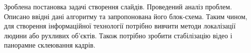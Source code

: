 \chapterConclusion

Зроблена постановка задачі створення слайдів. Проведений аналіз 
проблем. Описано ввідні дані алгоритму та запропонована 
його блок-схема. Таким чином, для створення інформаційної технології 
потрібно вивчити методи локалізації людини або рухливих об'єктів.
Також потрібно зробити стабілізацію відео і панорамне склеювання кадрів. 